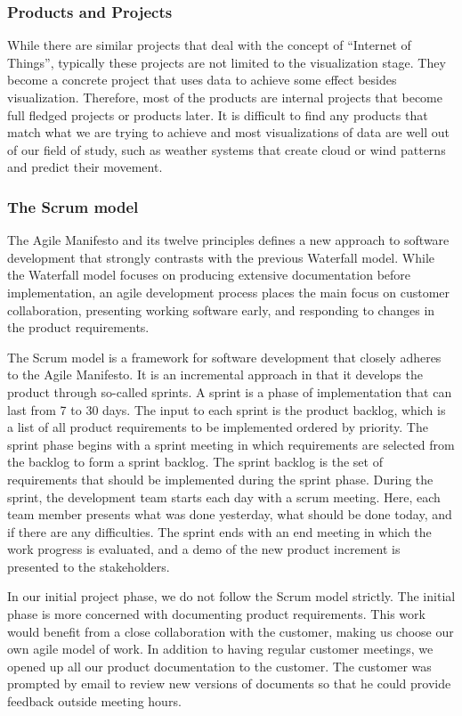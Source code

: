 \documentclass[../document]{subfiles}
\begin{document}
\subsubsection{Products and Projects}
While there are similar projects that deal with the concept of “Internet of Things”, typically these projects are not limited to the visualization stage. They become a concrete project that uses data to achieve some effect besides visualization. Therefore, most of the products are internal projects that become full fledged projects or products later. It is difficult to find any products that match what we are trying to achieve and most visualizations of data are well out of our field of study, such as weather systems that create cloud or wind patterns and predict their movement.

\subsubsection{The Scrum model}
\label{the_scrum_model}
The Agile Manifesto and its twelve principles defines a new approach to software development that strongly contrasts with the previous Waterfall model. While the Waterfall model focuses on producing extensive documentation before implementation, an agile development process places the main focus on customer collaboration, presenting working software early, and responding to changes in the product requirements. 

The Scrum model is a framework for software development that closely adheres to the Agile Manifesto. It is an incremental approach in that it develops the product through so-called sprints. A sprint is a phase of implementation that can last from 7 to 30 days. The input to each sprint is the product backlog, which is a list of all product requirements to be implemented ordered by priority. The sprint phase begins with a sprint meeting in which requirements are selected from the backlog to form a sprint backlog. The sprint backlog is the set of requirements that should be implemented during the sprint phase. During the sprint, the development team starts each day with a scrum meeting. Here, each team member presents what was done yesterday, what should be done today, and if there are any difficulties. The sprint ends with an end meeting in which the work progress is evaluated, and a demo of the new product increment is presented to the stakeholders.

In our initial project phase, we do not follow the Scrum model strictly. The initial phase is more concerned with documenting product requirements. This work would benefit from a close collaboration with the customer, making us choose our own agile model of work. In addition to having regular customer meetings, we opened up all our product documentation to the customer. The customer was prompted by email to review new versions of documents so that he could provide feedback outside meeting hours.
\end{document}
